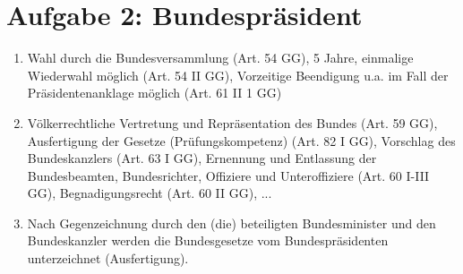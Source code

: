 \documentclass{article}
\begin{document}
	\section*{Aufgabe 2: Bundespräsident}
	\begin{enumerate}[label=(\alph*)]
		\item Wahl durch die Bundesversammlung (Art. 54 GG), 5 Jahre, einmalige Wiederwahl möglich (Art. 54 II GG), Vorzeitige Beendigung u.a. im Fall der Präsidentenanklage möglich (Art. 61 II 1 GG)
		\item Völkerrechtliche Vertretung und Repräsentation des Bundes (Art. 59 GG), Ausfertigung der Gesetze (Prüfungskompetenz) (Art. 82 I GG), Vorschlag des Bundeskanzlers (Art. 63 I GG), Ernennung und Entlassung der Bundesbeamten, Bundesrichter, Offiziere und Unteroffiziere (Art. 60 I-III GG), Begnadigungsrecht (Art. 60 II GG), ...
		\item Nach Gegenzeichnung durch den (die) beteiligten Bundesminister und den Bundeskanzler werden die Bundesgesetze vom Bundespräsidenten unterzeichnet (Ausfertigung).

\end{enumerate}
\end{document}
